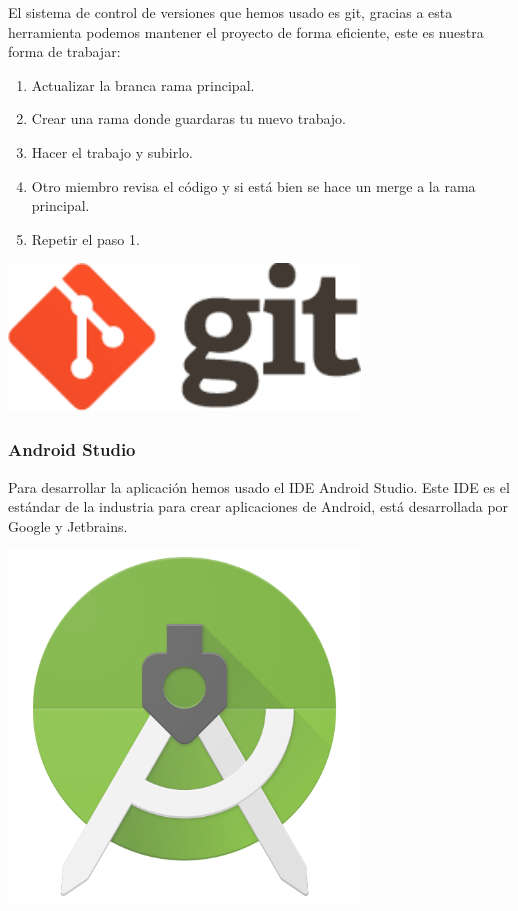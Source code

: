 \documentclass[12pt,a4paper]{article}
\begin{document}
\begin{minipage}{.75\textwidth}
El sistema de control de versiones que hemos usado es git, gracias a esta herramienta podemos mantener el proyecto de forma eficiente, este es nuestra forma de trabajar:

\begin{enumerate}
\item Actualizar la branca rama principal.
\item Crear una rama donde guardaras tu nuevo trabajo.
\item Hacer el trabajo y subirlo.
\item Otro miembro revisa el código y si está bien se hace un merge a la rama principal.
\item Repetir el paso 1.
\end{enumerate}
\end{minipage} %
\begin{minipage}{.25\textwidth}
  \includegraphics[width=0.7\textwidth, right]{git}
\end{minipage}


\subsubsection{Android Studio}

\begin{minipage}{.75\textwidth}
Para desarrollar la aplicación hemos usado el IDE Android Studio.
Este IDE es el estándar de la industria para crear aplicaciones de Android, está desarrollada por Google y Jetbrains.
\end{minipage} %
\begin{minipage}{.25\textwidth}
  \includegraphics[width=0.7\textwidth, right]{androidstudio}
\end{minipage}
\end{document}

